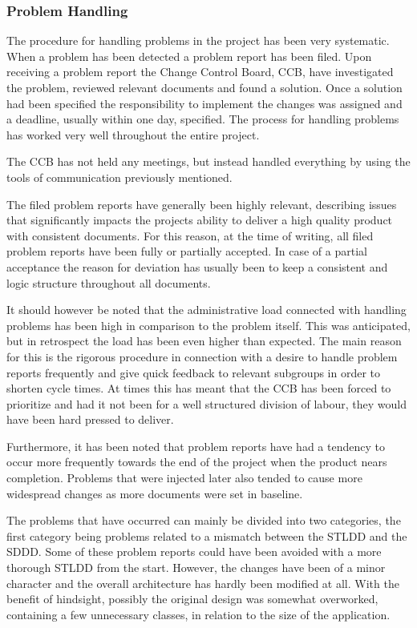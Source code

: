 \documentclass[a4paper]{article}
\begin{document}
\subsubsection{Problem Handling}

The procedure for handling problems in the project has been very systematic. When a problem has been detected a problem report has been filed. Upon receiving a problem report the Change Control Board, CCB, have investigated the problem, reviewed relevant documents and found a solution. Once a solution had been specified the responsibility to implement the changes was assigned and a deadline, usually within one day, specified. The process for handling problems has worked very well throughout the entire project. 

The CCB has not held any meetings, but instead handled everything by using the tools of communication previously mentioned.

The filed problem reports have generally been highly relevant, describing issues that significantly impacts the projects ability to deliver a high quality product with consistent documents. For this reason, at the time of writing, all filed problem reports have been fully or partially accepted. In case of a partial acceptance the reason for deviation has usually been to keep a consistent and logic structure throughout all documents.

It should however be noted that the administrative load connected with handling problems has been high in comparison to the problem itself. This was anticipated, but in retrospect the load has been even higher than expected. The main reason for this is the rigorous procedure in connection with a desire to handle problem reports frequently and give quick feedback to relevant subgroups in order to shorten cycle times. At times this has meant that the CCB has been forced to prioritize and had it not been for a well structured division of labour, they would have been hard pressed to deliver.

Furthermore, it has been noted that problem reports have had a tendency to occur more frequently towards the end of the project when the product nears completion. Problems that were injected later also tended to cause more widespread changes as more documents were set in baseline.

The problems that have occurred can mainly be divided into two categories, the first category being problems related to a mismatch between the STLDD and the SDDD. Some of these problem reports could have been avoided with a more thorough STLDD from the start. However, the changes have been of a minor character and the overall architecture has hardly been modified at all. With the benefit of hindsight, possibly the original design was somewhat overworked, containing a few unnecessary classes, in relation to the size of the application.
\end{document}
